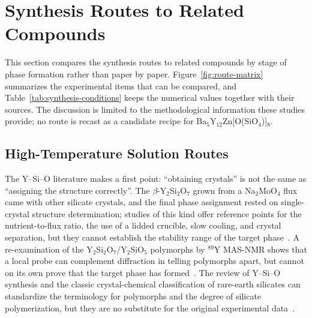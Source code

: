 \section{Synthesis Routes to Related Compounds}
\label{sec:neighbor-routes}

This section compares the synthesis routes to related compounds by stage of phase formation rather than paper by paper. Figure~\ref{fig:route-matrix} summarizes the experimental items that can be compared, and Table~\ref{tab:synthesis-conditions} keeps the numerical values together with their sources. The discussion is limited to the methodological information these studies provide; no route is recast as a candidate recipe for Ba$_5$Y$_{12}$Zn[O(SiO$_4$)]$_8$.

\subsection{High-Temperature Solution Routes}

The Y--Si--O literature makes a first point: ``obtaining crystals'' is not the same as ``assigning the structure correctly''. The $\beta$-Y$_2$Si$_2$O$_7$ grown from a Na$_2$MoO$_4$ flux came with other silicate crystals, and the final phase assignment rested on single-crystal structure determination; studies of this kind offer reference points for the nutrient-to-flux ratio, the use of a lidded crucible, slow cooling, and crystal separation, but they cannot establish the stability range of the target phase~\cite{redhammer2003beta}. A re-examination of the Y$_2$Si$_2$O$_7$\slash Y$_2$SiO$_5$ polymorphs by $^{89}$Y MAS\nobreakdash-NMR shows that a local probe can complement diffraction in telling polymorphs apart, but cannot on its own prove that the target phase has formed~\cite{becerro2004revisiting}. The review of Y--Si--O synthesis and the classic crystal-chemical classification of rare-earth silicates can standardize the terminology for polymorphs and the degree of silicate polymerization, but they are no substitute for the original experimental data~\cite{sun2014recent,felsche1973the}.

